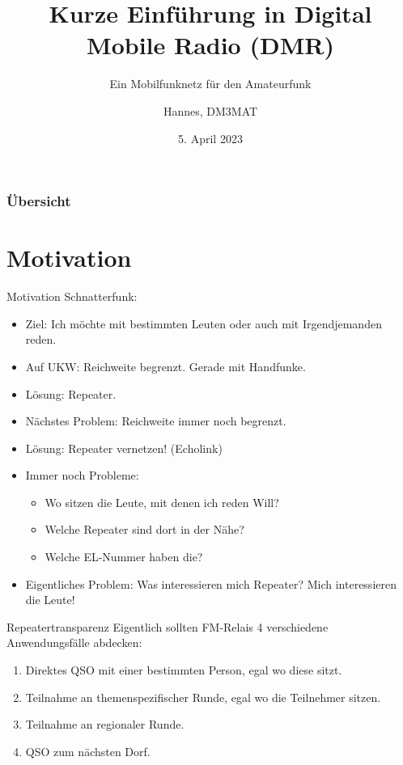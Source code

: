 \documentclass[aspectratio=169]{beamer}
\title[DMR]{Kurze Einführung in Digital Mobile Radio (DMR)}
\subtitle{Ein Mobilfunknetz für den Amateurfunk}
\author{Hannes, DM3MAT}
\institute{\texttt{dm3mat [at] darc [dot] de}}
\date{5. April 2023}
\begin{document}
\begin{frame}
 \titlepage
\end{frame}

\begin{frame} \frametitle{Übersicht}
 \tableofcontents
\end{frame}


\section{Motivation}
\begin{frame}{Motivation}
Schnatterfunk:
\begin{itemize}
 \item Ziel: Ich möchte mit bestimmten Leuten oder auch mit Irgendjemanden reden.
 \pause\item Auf UKW: Reichweite begrenzt. Gerade mit Handfunke.
 \pause\item Lösung: Repeater.
 \pause\item Nächstes Problem: Reichweite immer noch begrenzt.
 \pause\item Lösung: Repeater vernetzen! (Echolink)
 \pause\item Immer noch Probleme: 
 \begin{itemize}
  \pause\item Wo sitzen die Leute, mit denen ich reden Will?
  \pause\item Welche Repeater sind dort in der Nähe?
  \pause\item Welche EL-Nummer haben die? 
 \end{itemize}
 \pause\item Eigentliches Problem: Was interessieren mich Repeater? Mich interessieren die Leute!
\end{itemize}
\end{frame}

\begin{frame}{Repeatertransparenz}
Eigentlich sollten FM-Relais 4 verschiedene Anwendungsfälle abdecken:
\begin{enumerate}
 \pause\item Direktes QSO mit einer bestimmten Person, egal wo diese sitzt. \pause\Sadey
 \pause\item Teilnahme an themenspezifischer Runde, egal wo die Teilnehmer sitzen. \pause\Neutrey
 \pause\item Teilnahme an regionaler Runde. \pause\Neutrey
 \pause\item QSO zum nächsten Dorf. \pause\Smiley
\end{enumerate}
\end{frame}
\end{document}
